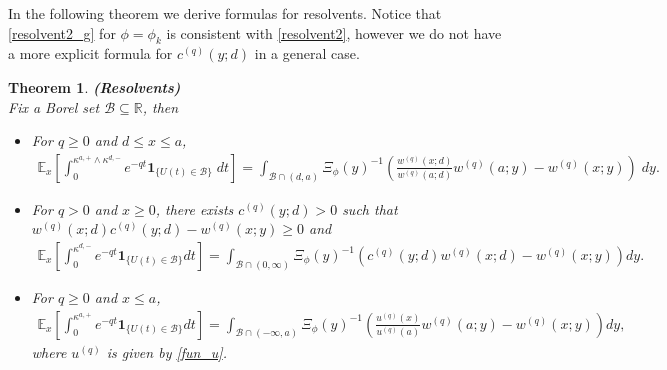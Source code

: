\documentclass[12pt,reqno]{amsart}
\newtheorem{theorem}{Theorem}
\theoremstyle{definition}
\theoremstyle{remark}
\newcommand{\e}{\mathbb{E}}
\newcommand{\ind}{\mathbf{1}}
\begin{document}
In the following theorem we derive formulas for resolvents. Notice that \eqref{resolvent2_g} for $\phi=\phi_k$ is consistent with \eqref{resolvent2}, however we do not have a more explicit formula for $c^{(q)}(y;d)$ in a general case.
\begin{theorem}{\textbf{(Resolvents)}}\label{Resolvents_sd}\\
	Fix a Borel set $\mathcal{B} \subseteq \mathbb{R}$, then
	\begin{itemize}
		\item[(i)] For  $q\geq 0$ and $d\leq x \leq a$,
		\begin{align}\label{resolvent1_g}
		\e_x\left[\int_0^{\kappa^{a,+}\wedge \kappa^{d,-}}e^{-qt}\ind_{\{U(t)\in 
\mathcal{B}\}}\;dt\right]
		= \int_{\mathcal{B} \cap (d,a)} \Xi_{\phi}(y)^{-1} \left(\frac{w^{(q)}(x;d)}{w^{(q)}(a;d)}w^{(q)}(a;y)-w^{(q)}(x;y)\right)\; dy.
		\end{align}
	      \item[(ii)]  For $q > 0$ and $x \geq 0$, there exists $c^{(q)}(y;d)>0$ such that
                $w^{(q)}(x;d) c^{(q)}(y;d)-w^{(q)}(x;y)\ge 0$ and
		\begin{align}\label{resolvent2_g}
		\e_x\left[\int_0^{\kappa^{d,-}}e^{-qt}\ind_{\{U(t)\in \mathcal{B}\}}dt\right]
		=\int_{\mathcal{B} \cap (0,\infty)}\Xi_{\phi}(y)^{-1}\left(c^{(q)}(y;d)w^{(q)}(x;d)-w^{(q)}(x;y)\right)dy.
		\end{align}
		\item[(iii)] For  $q \geq 0$ and $ x\leq a$,
		\begin{align}\label{resolvent3_g}
		\e_x\left[\int_0^{\kappa^{a,+}}e^{-qt}\ind_{\{U(t)\in \mathcal{B} \}}dt\right]
		= \int_{\mathcal{B} \cap (-\infty,a)} \Xi_{\phi}(y)^{-1} \left(\frac{u^{(q)}(x)}{u^{(q)}(a)}w^{(q)}(a;y)-w^{(q)}(x;y)\right)dy,
		\end{align}
		where $u^{(q)}$ is given by \eqref{fun_u}.
	\end{itemize}
\end{theorem}
\end{document}
